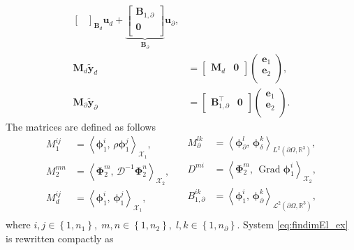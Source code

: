 \documentclass{svjour3}                     %
\DeclareMathOperator*{\Grad}{Grad}
\newcommand{\inner}[3][]{\ensuremath{\left\langle #2, \, #3 \right\rangle_{#1}}}
\begin{document}
{\begin{equation}
\begin{aligned}
{\begin{bmatrix}
\end{bmatrix}}_{\mathbf{B}_d}
\mathbf{u}_d
+ 
\underbrace{\begin{bmatrix}
\mathbf{B}_{1, \partial}\\
\mathbf{0}\\
\end{bmatrix}}_{\mathbf{B}_\partial}
\mathbf{u}_\partial, \\
\mathbf{M}_{d} \widetilde{\mathbf{y}}_d &= \begin{bmatrix}
\mathbf{M}_{d} & \mathbf{0}
\end{bmatrix} \begin{pmatrix}
\mathbf{e}_{1} \\
\mathbf{e}_{2} \\
\end{pmatrix},  \\
\mathbf{M}_\partial \widetilde{\mathbf{y}}_\partial &= \begin{bmatrix}
\mathbf{B}_{1, \partial}^\top & \mathbf{0}
\end{bmatrix} \begin{pmatrix}
\mathbf{e}_{1} \\
\mathbf{e}_{2} \\
\end{pmatrix}.
\end{aligned}
\end{equation}
The matrices are defined as follows 
\begin{equation}\label{eq:matrices}
\begin{aligned}
M_1^{ij} &= \inner[\mathscr{X}_1]{\bm\phi_1^i}{\rho \bm\phi_1^j}, \\
M_2^{mn} &= \inner[\mathscr{X}_2]{\bm\Phi_2^m}{\bm{\mathcal{D}}^{-1}\bm\Phi_2^n}, \\
M_d^{ij} &= \inner[\mathscr{X}_1]{\bm\phi_1^i}{\bm\phi_1^j}, \\
\end{aligned}\quad
\begin{aligned}
M_\partial^{lk} &= \inner[L^2(\partial \Omega, \mathbb{R}^3)]{\bm\phi_\partial^l}{\bm\phi_\delta^k}, \\
{D}^{mi} &= \inner[\mathscr{X}_2]{\bm\Phi_2^m}{\Grad\bm\phi_1^i}, \\
{B}_{1, \partial}^{ik} &= \inner[\mathscr{L}^2(\partial \Omega, \mathbb{R}^3)]{\bm\phi_1^i}{\bm\phi_\partial^k}, \\
\end{aligned}
\end{equation}
where $i, j \in \left\{1, n_1\right\}, \; m,n \in \left\{1, n_2\right\}, \; l, k \in \left\{1, n_\partial \right\}$. System \eqref{eq:findimEl_ex} is rewritten compactly as
}
\end{document}

